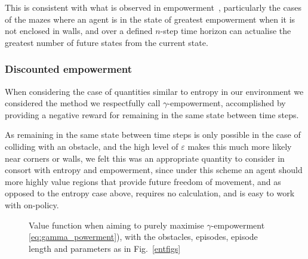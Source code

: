 \documentclass{article}
\begin{document}
This is consistent with what is observed in empowerment~\cite{klyubin2005empowerment}, particularly the cases of the mazes where an agent is in the state of greatest empowerment when it is not enclosed in walls, and over a defined $n$-step time horizon can actualise the greatest number of future states from the current state.

\subsubsection{Discounted empowerment\label{gammares_exp}}
When considering the case of quantities similar to entropy in our environment we considered the method we respectfully call $\gamma$-empowerment, accomplished by providing a negative reward for remaining in the same state between time steps.

As remaining in the same state between time steps is only possible in the case of colliding with an obstacle, and the high level of $\varepsilon$ makes this much more likely near corners or walls, we felt this was an appropriate quantity to consider in consort with entropy and empowerment, since under this scheme an agent should more highly value regions that provide future freedom of movement, and as opposed to the entropy case above, requires no calculation, and is easy to work with on-policy.

\begin{figure}[ht]

\centering
{}
\caption{Value function when aiming to purely maximise $\gamma$-empowerment \ref{eq:gamma_powerment}), with the obstacles, episodes, episode length and parameters as in Fig.~\ref{entfigs}\label{entsimilarfigs}}
\end{figure}
\end{document}
